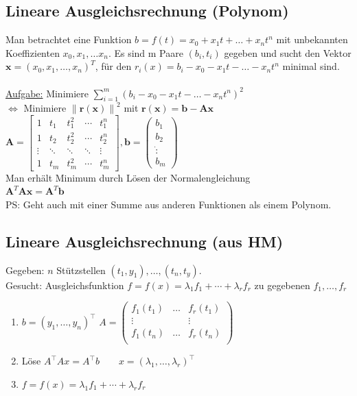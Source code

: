 \documentclass[6pt,a4paper]{scrartcl}
\let\olddot = \dot
\newcommand{\norm}[1]{\ensuremath{\|#1\|}}														%
\newcommand{\mat}[1]{\ensuremath{\begin{bmatrix} #1 \end{bmatrix}}}								%
\newcommand{\ma}[1]{\ensuremath{\boldsymbol {#1}}}												%
\newcommand{\vect}[1]{\ensuremath{\begin{pmatrix} #1 \end{pmatrix}}}							%
\newcommand{\svdots}{\ensuremath{\olddot :}}													%
\renewcommand{\vec}[1]{\ensuremath{\boldsymbol {#1}}}											%
\renewcommand*{\dot}[1]{\accentset{\mbox{\textrm{\large\bfseries .}} }{#1}}						%
\begin{document}
\begin{multicols*}{4}
\subsection{Lineare Ausgleichsrechnung (Polynom)}
Man betrachtet eine Funktion $b = f(t) = x_0 + x_1t + \ldots + x_nt^n$ mit unbekannten Koeffizienten $x_0, x_1, \ldots x_n$. Es sind m Paare $(b_i, t_i)$ gegeben und sucht
den Vektor $\vec x = (x_0, x_1, \ldots, x_n)^T$, für den $r_i(x) = b_i - x_0 - x_1t - \ldots - x_nt^n$ minimal sind. \\ \\
\underline{Aufgabe:} Minimiere $\sum\limits_{i = 1}^m (b_i - x_0 - x_1t - \ldots - x_nt^n)^2$ \\
$\Leftrightarrow$ Minimiere $\norm{\vec r(\vec x)}^2$ mit $\vec r(\vec x) = \vec b - \ma A \vec x$ \\
$\ma A = \mat{
	1 & t_1 & t_1^2 & \cdots & t_1^n \\
	1 & t_2 & t_2^2 & \cdots & t_2^n \\
	\vdots & \ddots & \ddots & \ddots & \vdots \\
	1 & t_m & t_m^2 & \cdots & t_m^n
}, \vec b = \vect{b_1 \\ b_2 \\ \svdots \\ b_m}$ \\
Man erhält Minimum durch Lösen der Normalengleichung \\
$\boxed{\ma A^T \ma A \vec x = \ma A^T \vec b}$\\
PS: Geht auch mit einer Summe aus anderen Funktionen als einem Polynom.

\subsection{Lineare Ausgleichsrechnung (aus HM)}
Gegeben: $n$ Stützstellen $(t_1,y_1),\dots,(t_n,t_y)$. \\
Gesucht: Ausgleichsfunktion $f=f(x)=\lambda_1 f_1 +\cdots+\lambda_r f_r$ zu gegebenen $f_1,\dots,f_r$
\begin{enumerate}
	\item $b = (y_1,\dots,y_n)^\top$ \qquad $A=\begin{pmatrix}
	f_1(t_1) & \dots & f_r(t_1) \\
	\vdots & & \vdots \\
	f_1(t_n) & \dots & f_r(t_n) \\
	\end{pmatrix}$
	\item Löse $A^\top Ax=A^\top b \qquad x=(\lambda_1,\dots,\lambda_r)^\top$
	\item $f=f(x)=\lambda_1 f_1 +\cdots+\lambda_r f_r$
\end{enumerate}
\fi


\end{multicols*}
\end{document}
